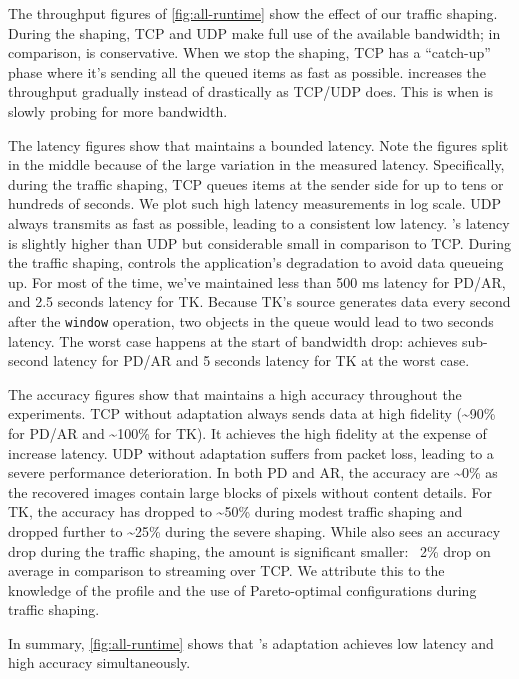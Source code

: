 The throughput figures of \autoref{fig:all-runtime} show the effect of our
traffic shaping. During the shaping, TCP and UDP make full use of the available
bandwidth; in comparison, \sysname{} is conservative. When we stop the shaping,
TCP has a ``catch-up'' phase where it's sending all the queued items as fast as
possible. \sysname{} increases the throughput gradually instead of drastically
as TCP/UDP does. This is when \sysname{} is slowly probing for more bandwidth.

The latency figures show that \sysname{} maintains a bounded latency. Note the
figures split in the middle because of the large variation in the measured
latency. Specifically, during the traffic shaping, TCP queues items at the
sender side for up to tens or hundreds of seconds. We plot such high latency
measurements in log scale. UDP always transmits as fast as possible, leading to
a consistent low latency. \sysname{}'s latency is slightly higher than UDP but
considerable small in comparison to TCP\@. During the traffic shaping,
\sysname{} controls the application's degradation to avoid data queueing up. For
most of the time, we've maintained less than 500 ms latency for PD/AR, and 2.5
seconds latency for TK\@. Because TK's source generates data every second after
the \texttt{window} operation, two objects in the queue would lead to two
seconds latency. The worst case happens at the start of bandwidth
drop: \sysname{} achieves sub-second latency for PD/AR and 5 seconds latency for
TK at the worst case.

The accuracy figures show that \sysname{} maintains a high accuracy throughout
the experiments. TCP without adaptation always sends data at high fidelity
(\textasciitilde 90\% for PD/AR and \textasciitilde 100\% for TK). It achieves
the high fidelity at the expense of increase latency. UDP without adaptation
suffers from packet loss, leading to a severe performance deterioration.  In
both PD and AR, the accuracy are \textasciitilde 0\% as the recovered images
contain large blocks of pixels without content details. For TK, the accuracy has
dropped to \textasciitilde 50\% during modest traffic shaping and dropped
further to \textasciitilde 25\% during the severe shaping. While \sysname{} also
sees an accuracy drop during the traffic shaping, the amount is significant
smaller: ~2\% drop on average in comparison to streaming over TCP\@.
We attribute this to the knowledge of the profile and the use of Pareto-optimal configurations during traffic shaping.

In summary, \autoref{fig:all-runtime} shows that \sysname{}'s adaptation achieves
low latency and high accuracy simultaneously.

